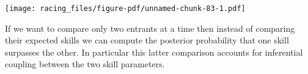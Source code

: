 \documentclass[
  letterpaper,
  DIV=11,
  numbers=noendperiod]{scrartcl}
\newenvironment{Shaded}{\begin{snugshade}}{\end{snugshade}}
\newcommand{\AttributeTok}[1]{\textcolor[rgb]{0.40,0.45,0.13}{#1}}
\newcommand{\ConstantTok}[1]{\textcolor[rgb]{0.56,0.35,0.01}{#1}}
\newcommand{\DecValTok}[1]{\textcolor[rgb]{0.68,0.00,0.00}{#1}}
\newcommand{\FloatTok}[1]{\textcolor[rgb]{0.68,0.00,0.00}{#1}}
\newcommand{\FunctionTok}[1]{\textcolor[rgb]{0.28,0.35,0.67}{#1}}
\newcommand{\NormalTok}[1]{\textcolor[rgb]{0.00,0.23,0.31}{#1}}
\newcommand{\OtherTok}[1]{\textcolor[rgb]{0.00,0.23,0.31}{#1}}
\newcommand{\SpecialCharTok}[1]{\textcolor[rgb]{0.37,0.37,0.37}{#1}}
\newcommand{\StringTok}[1]{\textcolor[rgb]{0.13,0.47,0.30}{#1}}
\begin{document}
\begin{Shaded}
\end{Shaded}

\texttt{[image: racing\_files/figure-pdf/unnamed-chunk-83-1.pdf]}

If we want to compare only two entrants at a time then instead of
comparing their expected skills we can compute the posterior probability
that one skill surpasses the other. In particular this latter comparison
accounts for inferential coupling between the two skill parameters.
\end{document}
